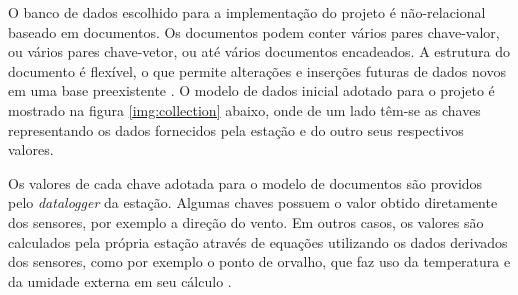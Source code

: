 O banco de dados escolhido para a implementação do projeto é não-relacional baseado em documentos. Os documentos podem conter vários pares chave-valor, ou vários pares chave-vetor, ou até vários documentos encadeados. A estrutura do documento é flexível, o que permite alterações e inserções futuras de dados novos em uma base preexistente \cite{SITEMONGODB}. O modelo de dados inicial adotado para o projeto é mostrado na figura \ref{img:collection} abaixo, onde de um lado têm-se as chaves representando os dados fornecidos pela estação e do outro seus respectivos valores.

\newpage

Os valores de cada chave adotada para o modelo de documentos são providos pelo \textit{datalogger} da estação. Algumas chaves possuem o valor obtido diretamente dos sensores, por exemplo a direção do vento. Em outros casos, os valores são calculados pela própria estação através de equações utilizando os dados derivados dos sensores, como por exemplo o ponto de orvalho, que faz uso da temperatura e da umidade externa em seu cálculo \cite{SITEVARIAVEIS}.
